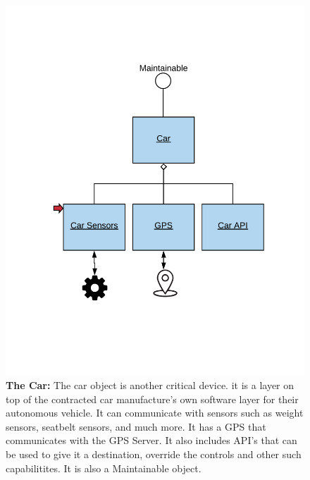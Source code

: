 \documentclass[12pt]{article}
\begin{document}
\begin{figure}[H]
    \centerline{\includegraphics[scale=.20]{Car.png}}
    \caption{\textbf{The Car: }The car object is another critical device. it is a layer on top of the contracted car 
manufacture's own software layer for their autonomous vehicle. It can communicate with sensors such as 
weight sensors, seatbelt sensors, and much more. It has a GPS that communicates with the GPS Server. 
It also includes API's that can be used to give it a destination, override the controls and other such 
capabilitites. It is also a Maintainable object.}
    \label{fig:Car}
\end{figure}
\end{document}
